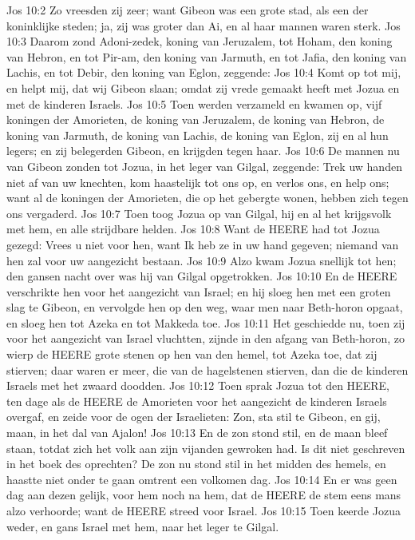 Jos 10:2  Zo vreesden zij zeer; want Gibeon was een grote stad, als een der koninklijke steden; ja, zij was groter dan Ai, en al haar mannen waren sterk.
Jos 10:3  Daarom zond Adoni-zedek, koning van Jeruzalem, tot Hoham, den koning van Hebron, en tot Pir-am, den koning van Jarmuth, en tot Jafia, den koning van Lachis, en tot Debir, den koning van Eglon, zeggende:
Jos 10:4  Komt op tot mij, en helpt mij, dat wij Gibeon slaan; omdat zij vrede gemaakt heeft met Jozua en met de kinderen Israels.
Jos 10:5  Toen werden verzameld en kwamen op, vijf koningen der Amorieten, de koning van Jeruzalem, de koning van Hebron, de koning van Jarmuth, de koning van Lachis, de koning van Eglon, zij en al hun legers; en zij belegerden Gibeon, en krijgden tegen haar.
Jos 10:6  De mannen nu van Gibeon zonden tot Jozua, in het leger van Gilgal, zeggende: Trek uw handen niet af van uw knechten, kom haastelijk tot ons op, en verlos ons, en help ons; want al de koningen der Amorieten, die op het gebergte wonen, hebben zich tegen ons vergaderd.
Jos 10:7  Toen toog Jozua op van Gilgal, hij en al het krijgsvolk met hem, en alle strijdbare helden.
Jos 10:8  Want de HEERE had tot Jozua gezegd: Vrees u niet voor hen, want Ik heb ze in uw hand gegeven; niemand van hen zal voor uw aangezicht bestaan.
Jos 10:9  Alzo kwam Jozua snellijk tot hen; den gansen nacht over was hij van Gilgal opgetrokken.
Jos 10:10  En de HEERE verschrikte hen voor het aangezicht van Israel; en hij sloeg hen met een groten slag te Gibeon, en vervolgde hen op den weg, waar men naar Beth-horon opgaat, en sloeg hen tot Azeka en tot Makkeda toe.
Jos 10:11  Het geschiedde nu, toen zij voor het aangezicht van Israel vluchtten, zijnde in den afgang van Beth-horon, zo wierp de HEERE grote stenen op hen van den hemel, tot Azeka toe, dat zij stierven; daar waren er meer, die van de hagelstenen stierven, dan die de kinderen Israels met het zwaard doodden.
Jos 10:12  Toen sprak Jozua tot den HEERE, ten dage als de HEERE de Amorieten voor het aangezicht de kinderen Israels overgaf, en zeide voor de ogen der Israelieten: Zon, sta stil te Gibeon, en gij, maan, in het dal van Ajalon!
Jos 10:13  En de zon stond stil, en de maan bleef staan, totdat zich het volk aan zijn vijanden gewroken had. Is dit niet geschreven in het boek des oprechten? De zon nu stond stil in het midden des hemels, en haastte niet onder te gaan omtrent een volkomen dag.
Jos 10:14  En er was geen dag aan dezen gelijk, voor hem noch na hem, dat de HEERE de stem eens mans alzo verhoorde; want de HEERE streed voor Israel.
Jos 10:15  Toen keerde Jozua weder, en gans Israel met hem, naar het leger te Gilgal.
